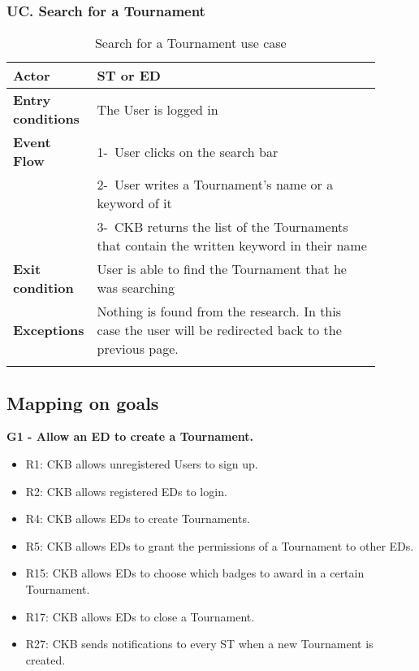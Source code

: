 \subsubsection*{UC\cuc . Search for a Tournament}
\begin{center}
    \begin{longtable}{|l|p{0.9\linewidth}|}
        \hline
        \textbf{Actor}            & ST or ED                                                                                                                                                                                       \\
        \hline
        \textbf{Entry conditions} & The User is logged in  \\
        \hline
        \textbf{Event Flow}       & 1-\ User clicks on the search bar        \\
        & 2-\ User writes a Tournament's name or a keyword of it \\
        & 3-\ CKB returns the list of the Tournaments that contain the written keyword in their name         \\
        \hline
        \textbf{Exit condition}   & User is able to find the Tournament that he was searching        \\
        \hline
        \textbf{Exceptions}        & Nothing is found from the research. In this case the user will be redirected back to the previous page.\\%
        \hline
        \caption{Search for a Tournament use case}
        \label{tab: search_for_a_Tournament_use_case}
    \end{longtable}
\end{center}


\subsection{Mapping on goals}
\label{subsec:mapping_on_goals}%
\textbf{G1 - Allow an ED to create a Tournament.}\\
\begin{itemize}
    \item R1: CKB allows unregistered Users to sign up.
    \item R2: CKB allows registered EDs to login.
    \item R4: CKB allows EDs to create Tournaments.
    \item R5: CKB allows EDs to grant the permissions of a Tournament to other EDs.
    \item R15: CKB allows EDs to choose which badges to award in a certain Tournament.
    \item R17: CKB allows EDs to close a Tournament.
    \item R27: CKB sends notifications to every ST when a new Tournament is created.
\end{itemize}


